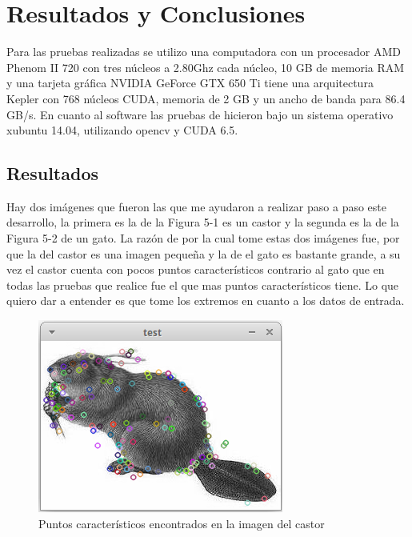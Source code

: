 \chapter{Resultados y Conclusiones}

Para las pruebas realizadas se utilizo una computadora con un procesador AMD Phenom II 720 con tres núcleos a 2.80Ghz cada núcleo, 10 GB de memoria RAM y una tarjeta gráfica NVIDIA GeForce GTX 650 Ti tiene una arquitectura Kepler con 768 núcleos CUDA, memoria de 2 GB y un ancho de banda para 86.4 GB/s. En cuanto al software las pruebas de hicieron bajo un sistema operativo xubuntu 14.04, utilizando opencv y CUDA 6.5.

\section{Resultados}

Hay dos imágenes que fueron las que me ayudaron a realizar paso a paso este desarrollo, la primera es la de la Figura 5-1 es un castor y la 
segunda es la de la Figura 5-2 de un gato. La razón de por la cual tome estas dos imágenes fue, por que la del castor es una imagen pequeña y la de el gato es bastante grande, a su vez el castor cuenta con pocos puntos característicos contrario al gato que en todas las pruebas que realice fue el que mas puntos característicos tiene. Lo que quiero dar a entender es que tome los extremos en cuanto a los datos de entrada. 

\begin{figure}[ph]
			\centering
				\includegraphics[scale=1]{img/castor.png}
			\caption{Puntos característicos encontrados en la imagen del castor}
\end{figure}


